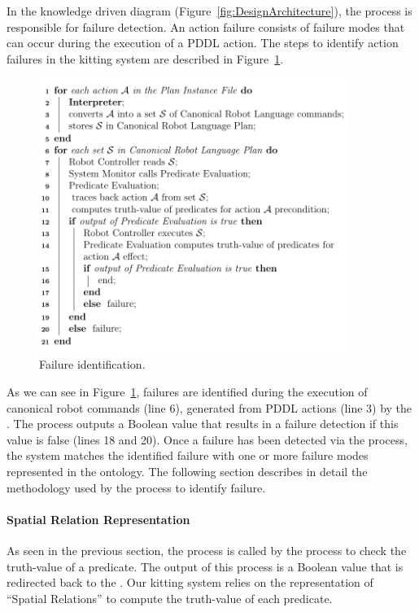 In the knowledge driven diagram (Figure~\ref{fig:DesignArchitecture}), the 
 process is responsible for failure detection. 
An action failure consists of failure modes that can occur during the execution of a 
PDDL action. The steps to identify action failures in the kitting system are 
described in Figure~\ref{fig:algo}.

\begin{figure}[h!t!]
  \centering
  \includegraphics[width=10cm]{images/algorithm.pdf}
  \caption{Failure identification.}
  \label{fig:algo}
\end{figure}

As we can see in Figure~\ref{fig:algo}, failures are identified during the execution of 
canonical robot commands (line 6), generated from PDDL actions (line 3) by the . 
The  process outputs a Boolean value that results in a 
failure detection if this value is false (lines 18 and 20). Once a failure has been 
detected via the  process, the system matches the 
identified failure with one or more failure modes represented in the ontology. The 
following section describes in detail the methodology used by the  
process to identify failure.


\paragraph{Spatial Relation Representation}
As seen in the previous section, the  process is called by 
the  process to check the truth-value of a predicate. The output 
of this process is a Boolean value that is redirected back to the . 
Our kitting system relies on the representation of ``Spatial Relations'' 
to compute the truth-value of each predicate.

